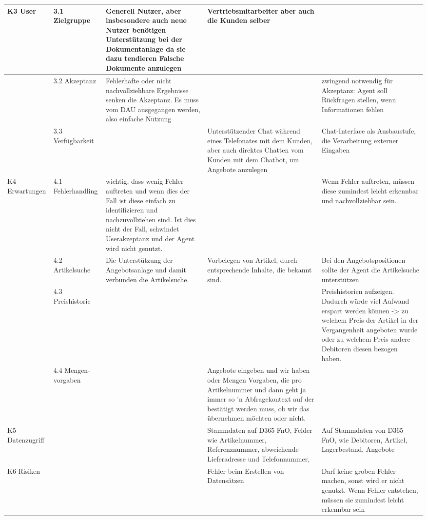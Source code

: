 \begin{longtable}{|p{1.9cm}|p{1.9cm}|p{3cm}|p{3cm}|p{3cm}|}
K3 User & 3.1 Zielgruppe & Generell Nutzer, aber insbesondere auch neue Nutzer benötigen Unterstützung bei der Dokumentanlage da sie dazu tendieren Falsche Dokumente anzulegen & Vertriebsmitarbeiter aber auch die Kunden selber &  \\
\hline
 & 3.2 Akzeptanz & Fehlerhafte oder nicht nachvollziehbare Ergebnisse senken die Akzeptanz. Es muss vom DAU ausgegangen werden, also einfache Nutzung &  & zwingend notwendig für Akzeptanz: Agent soll Rückfragen stellen, wenn Informationen fehlen \\
\hline
 & 3.3 Verfügbarkeit &  & Unterstützender Chat während eines Telefonates mit dem Kunden, aber auch direktes Chatten vom Kunden mit dem Chatbot, um Angebote anzulegen & Chat-Interface als Ausbaustufe, die Verarbeitung externer Eingaben \\
\hline

K4 Erwartungen & 4.1 Fehlerhandling & wichtig, dass wenig Fehler auftreten und wenn dies der Fall ist diese einfach zu identifizieren und nachzuvollziehen sind. Ist dies nicht der Fall, schwindet Userakzeptanz und der Agent wird nicht genutzt. &  & Wenn Fehler auftreten, müssen diese zumindest leicht erkennbar und nachvollziehbar sein. \\
\hline

 & 4.2 Artikelsuche & Die Unterstützung der Angebotsanlage und damit verbunden die Artikelsuche. & Vorbelegen von Artikel, durch entsprechende Inhalte, die bekannt sind. & Bei den Angebotspositionen sollte der Agent die Artikelsuche unterstützen \\
\hline
 & 4.3 Preishistorie &  &  & Preishistorien aufzeigen. Dadurch würde viel Aufwand erspart werden können -> zu welchem Preis der Artikel in der Vergangenheit angeboten wurde oder zu welchem Preis andere Debitoren diesen bezogen haben. \\
\hline
 & 4.4 Mengen-vorgaben &  & Angebote eingeben und wir haben oder Mengen Vorgaben, die pro Artikelnummer und dann geht ja immer so 'n Abfragekontext auf der bestätigt werden muss, ob wir das übernehmen möchten oder nicht. &  \\
\hline

K5 Datenzugriff &  &  & Stammdaten auf D365 FnO, Felder wie Artikelnummer, Referenznummer, abweichende Lieferadresse und Telefonnummer, & Auf Stammdaten von D365 FnO, wie Debitoren, Artikel, Lagerbestand, Angebote \\
\hline

K6 Risiken &  &  & Fehler beim Erstellen von Datensätzen & Darf keine groben Fehler machen, sonst wird er nicht genutzt. Wenn Fehler entstehen, müssen sie zumindest leicht erkennbar sein \\
\hline


\end{longtable}
